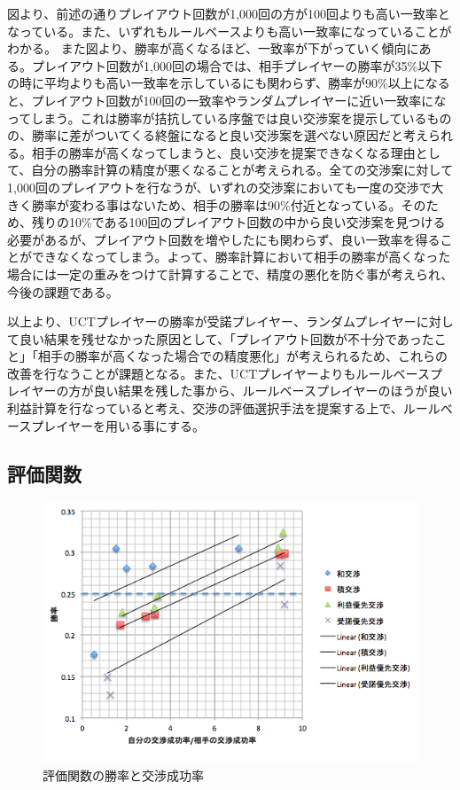 \documentclass[a4, 10pt,dvipdfmx,twocolumn]{jsarticle}
\begin{document}
図より、前述の通りプレイアウト回数が1,000回の方が100回よりも高い一致率となっている。また、いずれもルールベースよりも高い一致率になっていることがわかる。
また図より、勝率が高くなるほど、一致率が下がっていく傾向にある。プレイアウト回数が1,000回の場合では、相手プレイヤーの勝率が35\%以下の時に平均よりも高い一致率を示しているにも関わらず、勝率が90\%以上になると、プレイアウト回数が100回の一致率やランダムプレイヤーに近い一致率になってしまう。これは勝率が拮抗している序盤では良い交渉案を提示しているものの、勝率に差がついてくる終盤になると良い交渉案を選べない原因だと考えられる。相手の勝率が高くなってしまうと、良い交渉を提案できなくなる理由として、自分の勝率計算の精度が悪くなることが考えられる。全ての交渉案に対して1,000回のプレイアウトを行なうが、いずれの交渉案においても一度の交渉で大きく勝率が変わる事はないため、相手の勝率は90\%付近となっている。そのため、残りの10\%である100回のプレイアウト回数の中から良い交渉案を見つける必要があるが、プレイアウト回数を増やしたにも関わらず、良い一致率を得ることができなくなってしまう。よって、勝率計算において相手の勝率が高くなった場合には一定の重みをつけて計算することで、精度の悪化を防ぐ事が考えられ、今後の課題である。

以上より、UCTプレイヤーの勝率が受諾プレイヤー、ランダムプレイヤーに対して良い結果を残せなかった原因として、「プレイアウト回数が不十分であったこと」「相手の勝率が高くなった場合での精度悪化」が考えられるため、これらの改善を行なうことが課題となる。また、UCTプレイヤーよりもルールベースプレイヤーの方が良い結果を残した事から、ルールベースプレイヤーのほうが良い利益計算を行なっていると考え、交渉の評価選択手法を提案する上で、ルールベースプレイヤーを用いる事にする。



\subsection{評価関数}


\begin{figure}[t]
    \begin{center}
      \includegraphics[width=120mm]{img/relation_winrate.png}
    \end{center}
    \caption{評価関数の勝率と交渉成功率}
    \label{win_rate}
\end{figure}
\end{document}
